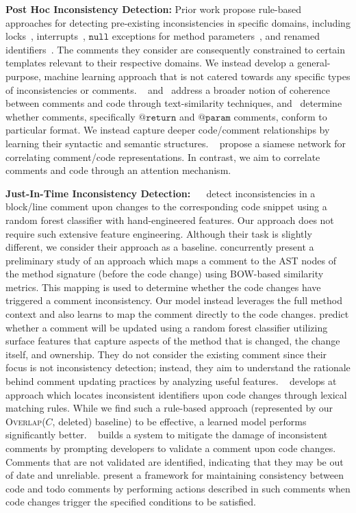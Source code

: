 \documentclass[letterpaper]{article} %
\makeatletter
\newcommand{\CodeIn}[1]{{\ifmmode{\mathtt{#1}}\else$\mathtt{#1}$\fi}}
\newcommand{\Return}{\CodeIn{@return}}
\newcommand{\Param}{\CodeIn{@param}}
\newcommand{\Comment}{$C$}
\newcommand{\HasOverlap}{\textsc{Overlap}}
\newcommand{\DeletedCode}{deleted}
\makeatother
\begin{document}
\noindent\textbf{Post Hoc Inconsistency Detection:}
Prior work propose rule-based approaches for detecting pre-existing inconsistencies in specific domains, including locks~\cite{icomment2007}, interrupts~\cite{aComment}, \CodeIn{null} exceptions for method parameters~\cite{ZhouParameter,tComment}, and renamed identifiers~\cite{ratol2017fragile}. The comments they consider are consequently constrained to certain templates relevant to their respective domains. We instead develop a general-purpose, machine learning approach that is not catered towards any specific types of inconsistencies or comments. \citeauthor{Corazza18}~ and~\citet{Cimasa19} address a broader notion of coherence between comments and code through text-similarity techniques, and~\citet{Khamis2010AutomaticQA} determine whether comments, specifically \Return{} and \Param{} comments, conform to particular format. We instead capture deeper code/comment relationships by learning their syntactic and semantic structures. ~\citet{RabbiInconsistencySiamese} propose a siamese network
for correlating comment/code representations. In contrast, we aim to correlate comments and code through an attention mechanism.

\noindent\textbf{Just-In-Time Inconsistency Detection:}
~\citeauthor{LiuOutdatedLine}~ detect inconsistencies in a block/line comment upon changes to the corresponding code snippet using a random forest classifier with hand-engineered features. Our approach does not require such extensive feature engineering. Although their task is slightly different, we consider their approach as a baseline.
\citet{StulovaTowards} concurrently present a preliminary study of an approach which maps a comment to the AST nodes of the method signature (before the code change) using BOW-based similarity metrics. This mapping is used to determine whether the code changes have triggered a comment inconsistency. Our model instead leverages the full method context and also learns to map the comment directly to the code changes. \citet{Malik08} predict whether a comment will be updated using a random forest classifier utilizing surface features that capture aspects of the method that is changed, the change itself, and ownership. They do not consider the existing comment since their focus is not inconsistency detection; instead, they aim to understand the rationale behind comment updating practices by analyzing useful features. ~\citet{SaduThesis} develops at approach which locates inconsistent identifiers upon code changes through lexical matching rules. While we find such a rule-based approach (represented by our \HasOverlap{}(\Comment{}, \DeletedCode{}) baseline) to be effective, a learned model performs significantly better. ~\citet{Svensson2015ReducingOA} builds a system to mitigate the damage of inconsistent comments by prompting developers to validate a comment upon code changes. Comments that are not validated are identified, indicating that they may be out of date and unreliable. \citet{NieTrigit} present a framework for maintaining consistency between code and todo comments by performing actions described in such comments when code changes trigger the specified conditions to be satisfied.
\end{document}
